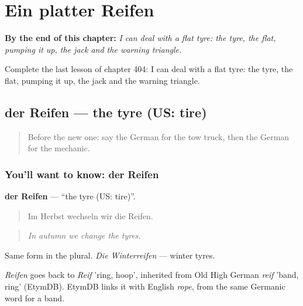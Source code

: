 
\chapter{Ein platter Reifen}
\label{ch:ge-ein-platter-reifen}

\begin{chapteropening}
\textbf{By the end of this chapter:} \emph{I can deal with a flat tyre: the tyre, the flat, pumping it up, the jack and the warning triangle.}

Complete the last lesson of chapter 404: I can deal with a flat tyre: the tyre, the flat, pumping it up, the jack and the warning triangle.
\end{chapteropening}

\section[der Reifen]{der Reifen — the tyre (US: tire)}

\label{lesson:GE-C404-reifen}



\begin{quote}
Before the new one: say the German for the tow truck, then the German for the mechanic.
\end{quote}

\subsection*{You'll want to know: der Reifen}
\textbf{der Reifen} — \textquotedblleft{}the tyre (US: tire)\textquotedblright{}.

\begin{quote}
Im Herbst wechseln wir die Reifen.
\end{quote}

\begin{quote}
\emph{In autumn we change the tyres.}
\end{quote}

Same form in the plural. \emph{Die Winterreifen} — winter tyres.

\begin{cousinweb}
\emph{Reifen} goes back to \emph{Reif} 'ring, hoop', inherited from Old High German \emph{reif} 'band, ring' (EtymDB). EtymDB links it with English \emph{rope}, from the same Germanic word for a band.
\end{cousinweb}

